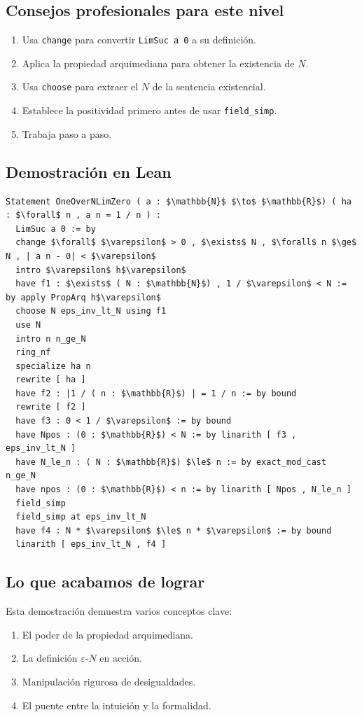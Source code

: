 \subsection{Consejos profesionales para este nivel}
\begin{enumerate}
    \item Usa \texttt{change} para convertir \texttt{LimSuc a 0} a su definición.
    \item Aplica la propiedad arquimediana para obtener la existencia de $N$.
    \item Usa \texttt{choose} para extraer el $N$ de la sentencia existencial.
    \item Establece la positividad primero antes de usar \texttt{field\_simp}.
    \item Trabaja paso a paso.
\end{enumerate}

\subsection{Demostración en Lean}

\begin{verbatim}
Statement OneOverNLimZero ( a : $\mathbb{N}$ $\to$ $\mathbb{R}$) ( ha : $\forall$ n , a n = 1 / n ) :
  LimSuc a 0 := by
  change $\forall$ $\varepsilon$ > 0 , $\exists$ N , $\forall$ n $\ge$ N , | a n - 0| < $\varepsilon$
  intro $\varepsilon$ h$\varepsilon$
  have f1 : $\exists$ ( N : $\mathbb{N}$) , 1 / $\varepsilon$ < N := by apply PropArq h$\varepsilon$
  choose N eps_inv_lt_N using f1
  use N
  intro n n_ge_N
  ring_nf
  specialize ha n
  rewrite [ ha ]
  have f2 : |1 / ( n : $\mathbb{R}$) | = 1 / n := by bound
  rewrite [ f2 ]
  have f3 : 0 < 1 / $\varepsilon$ := by bound
  have Npos : (0 : $\mathbb{R}$) < N := by linarith [ f3 , eps_inv_lt_N ]
  have N_le_n : ( N : $\mathbb{R}$) $\le$ n := by exact_mod_cast n_ge_N
  have npos : (0 : $\mathbb{R}$) < n := by linarith [ Npos , N_le_n ]
  field_simp
  field_simp at eps_inv_lt_N
  have f4 : N * $\varepsilon$ $\le$ n * $\varepsilon$ := by bound
  linarith [ eps_inv_lt_N , f4 ]
\end{verbatim}

\subsection{Lo que acabamos de lograr}
Esta demostración demuestra varios conceptos clave:
\begin{enumerate}
    \item El poder de la propiedad arquimediana.
    \item La definición $\varepsilon$-$N$ en acción.
    \item Manipulación rigurosa de desigualdades.
    \item El puente entre la intuición y la formalidad.
\end{enumerate}

